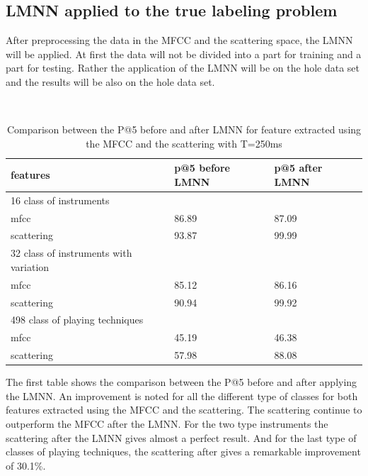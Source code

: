\documentclass[hidelinks,12pt]{report}
\begin{document}
\subsection{LMNN applied to the true labeling problem}
After preprocessing the data in the MFCC and the scattering space, the LMNN will be applied. At first the data will not be divided into a part for training and a part for testing. Rather the application of the LMNN will be on the hole data set and the results will be also on the hole data set.
\begin{table} [H]
\begin{center} 
\ 
 \setlength{\tabcolsep}{.16667em} 
\begin{tabular}{|l|l|l|} 
\hline
features & p@5 before LMNN & p@5 after LMNN \\ 
\hline 
16 class of instruments \\ 
\hline
mfcc & 86.89& 87.09  \\ 
scattering & 93.87 & 99.99  \\ 

\hline 
32 class of instruments with variation \\ 
\hline
mfcc & 85.12 & 86.16  \\ 
scattering & 90.94 & 99.92  \\ 
\hline 
498 class of playing techniques \\ 
\hline
mfcc &  45.19 & 46.38  \\ 
scattering & 57.98 & 88.08  \\ 
\hline
\end{tabular} 
\end{center} 
\caption{Comparison between the P@5 before and after LMNN for feature extracted using the MFCC and the scattering with T=250ms} 
\label{you} 
\end{table}

The first table shows the comparison between the P@5 before and after applying the LMNN. An improvement is noted for all the different type of classes for both features extracted using the MFCC and the scattering. The scattering continue to outperform the MFCC after the LMNN. For the two type instruments the scattering after the LMNN gives almost a perfect result. And for the last type of classes of playing techniques, the scattering after gives a remarkable improvement of 30.1\%.
\end{document}
